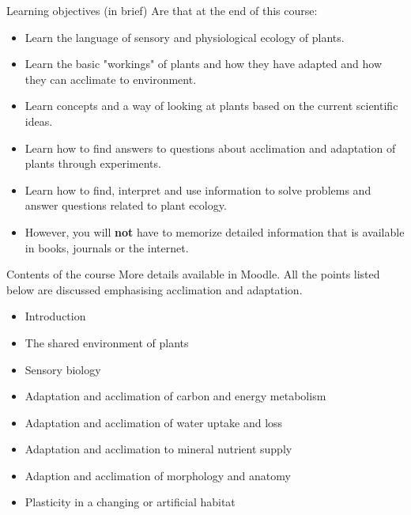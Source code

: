 \documentclass[10pt]{beamer}
\begin{document}
\begin{frame}{Learning objectives (in brief)}
    Are that at the end of this course:
    \begin{itemize}
    \item Learn the language of sensory and physiological ecology of plants.
    \item Learn the basic "workings" of plants and how they have adapted and how they can acclimate to environment.
    \item Learn concepts and a way of looking at plants based on the current scientific ideas.
    \item Learn how to find answers to questions about acclimation and adaptation of plants through experiments.
    \item Learn how to find, interpret and use information to solve problems and answer questions related to plant ecology.
    \item However, you will \textbf{not} have to memorize detailed information that is available in books, journals or the internet.
    \end{itemize}
\end{frame}

\begin{frame}{Contents of the course}
More details available in Moodle. All the points listed below are discussed emphasising acclimation and adaptation.
\begin{itemize}
   \item Introduction
   \item The shared environment of plants
   \item Sensory biology
   \item Adaptation and acclimation of carbon and energy metabolism
   \item Adaptation and acclimation of water uptake and loss
   \item Adaptation and acclimation to mineral nutrient supply
   \item Adaption and acclimation of morphology and anatomy
   \item Plasticity in a changing or artificial habitat
\end{itemize}
\end{frame}
\end{document}
